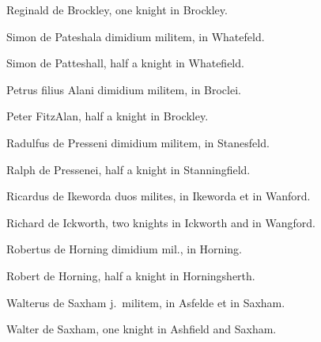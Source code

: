 \documentclass[10pt]{book}
\begin{document}
\begin{paracol}{2}
Reginald de Brockley, one knight in Brockley.

\switchcolumn*

\begin{otherlanguage}{latin}
Simon de Pateshala dimidium militem, in Whatefeld.
\end{otherlanguage}

\switchcolumn

Simon de Patteshall, half a knight in Whatefield.

\switchcolumn*

\begin{otherlanguage}{latin}
Petrus filius Alani dimidium militem, in Broclei.
\end{otherlanguage}

\switchcolumn

Peter FitzAlan, half a knight in Brockley.

\switchcolumn*

\begin{otherlanguage}{latin}
Radulfus de Presseni dimidium militem, in Stanesfeld.
\end{otherlanguage}

\switchcolumn

Ralph de Pressenei, half a knight in Stanningfield.

\switchcolumn*

\begin{otherlanguage}{latin}
Ricardus de Ikeworda duos milites, in Ikeworda et in Wanford.
\end{otherlanguage}

\switchcolumn

Richard de Ickworth, two knights in Ickworth and in Wangford.

\switchcolumn*

\begin{otherlanguage}{latin}
Robertus de Horning dimidium mil., in Horning.
\end{otherlanguage}

\switchcolumn

Robert de Horning, half a knight in Horningsherth.

\switchcolumn*

\begin{otherlanguage}{latin}
Walterus de Saxham j.\ militem, in Asfelde et in Saxham.
\end{otherlanguage}

\switchcolumn

Walter de Saxham, one knight in Ashfield and Saxham.


\end{paracol}
\end{document}
